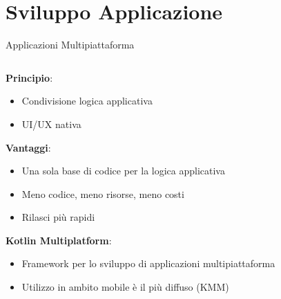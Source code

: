 
\section{Sviluppo Applicazione}

\begin{frame}{Applicazioni Multipiattaforma}
    \begin{columns}[onlytextwidth]
        \begin{column}{0.5\textwidth}
        
            \textbf{Principio}:
            \begin{itemize}
                \item Condivisione logica applicativa
                \item UI/UX nativa
            \end{itemize}
        
            \vspace{2mm}
        
            \textbf{Vantaggi}:
            \begin{itemize}
                \item Una sola base di codice per la logica applicativa
                \item Meno codice, meno risorse, meno costi
                \item Rilasci più rapidi
            \end{itemize}

            \vspace{2mm}
        
            \textbf{Kotlin Multiplatform}:
            \begin{itemize}
                \item Framework per lo sviluppo di applicazioni multipiattaforma 
                \item Utilizzo in ambito mobile è il più diffuso (KMM)
            \end{itemize}
    
        \end{column}
        \begin{column}{0.5\textwidth}
        

\end{column}
\end{columns}
\end{frame}
